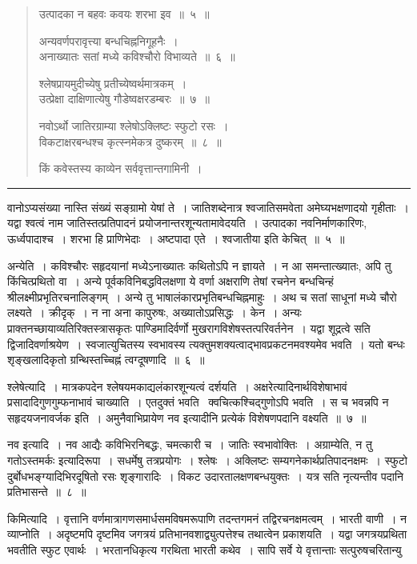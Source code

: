 \documentclass[11pt, openany]{book}
\begin{document}
\newpage

\begin{quote}
{\ha उत्पादका न बहवः कवयः शरभा इव~॥~५~॥

अन्यवर्णपरावृत्त्या बन्धचिह्ननिगूहनैः~।\\
अनाख्यातः सतां मध्ये कविश्चौरो विभाव्यते~॥~६~॥

श्लेषप्रायमुदीच्येषु प्रतीच्येष्वर्थमात्रकम्~।\\
उत्प्रेक्षा दाक्षिणात्येषु गौडेष्वक्षरडम्बरः~॥~७~॥

नवोऽर्थो जातिरग्राम्या श्लेषोऽक्लिष्टः स्फुटो रसः~।\\
विकटाक्षरबन्धश्च कृत्स्नमेकत्र दुष्करम्~॥~८~॥

किं कवेस्तस्य काव्येन सर्ववृत्तान्तगामिनी~।}
\end{quote}

\hrule

\noindent
{\s वानोऽप्यसंख्या नास्ति संख्यं सङ्ग्रामो येषां ते~। जातिशब्देनात्र श्वजातिसमवेता अमेघ्यभक्षणादयो गृहीताः~। यद्वा श्वत्वं नाम जातिस्तत्प्रतिपादनं प्रयोजनान्तरशून्यतामावेदयति~। उत्पादका नवनिर्माणकारिणः, ऊर्ध्वपादाश्च~। शरभा हि प्राणिभेदाः~। अष्टपादा एते~। श्वजातीया इति केचित्~॥~५~॥

{\qtt अन्येति}~। कविश्चौरः सहृदयानां मध्येऽनाख्यातः कथितोऽपि न ज्ञायते~। न आ समन्तात्ख्यातः, अपि तु किंचित्प्रथितो वा~। अन्ये पूर्वकविनिबद्धविलक्षणा ये वर्णा अक्षराणि तेषां रचनेन बन्धचिन्हं श्रीलक्ष्मीप्रभृतिरचनालिङ्गम्~। अन्ये तु भाषालंकारप्रभृतिबन्धचिह्नमाहुः~। अथ च सतां साधूनां मध्ये चौरो लक्ष्यते~। क्रीदृक्~। न ना अना कापुरुषः, अख्यातोऽप्रसिद्धः~। केन~। अन्यः प्राक्तनच्छायाव्यतिरिक्तस्त्रासकृतः पाण्डिमादिर्वर्णो मुखरागविशेषस्तत्परिवर्तनेन~। यद्वा शूद्रत्वे सति द्विजादिवर्णाश्रयेण~। स्वजात्युचितस्य स्वभावस्य त्यक्तुमशक्यत्वाद्भावप्रकटनमवश्यमेव भवति~। यतो बन्धः शृङ्खलादिकृतो ग्रन्थिस्तच्चिह्नं त्वग्दूषणादि~॥~६~॥

{\qtt श्लेषेत्यादि}~। मात्रकपदेन श्लेषयमकाद्यलंकारशून्यत्वं दर्शयति~। अक्षरेत्यादिनार्थविशेषाभावं प्रसादादिगुणगुम्फनाभावं चाख्याति~। एतदुक्तं भवति \textendash\ क्वचित्कश्चिद्गुणोऽपि भवति~। स च भवन्नपि न सहृदयजनावर्जक इति~। अमुनैवाभिप्रायेण नव इत्यादीनि प्रत्येकं विशेषणपदानि वक्ष्यति~॥~७~॥

{\qtt नव इत्यादि}~। नव आद्यैः कविभिरनिबद्धः, चमत्कारी च~। जातिः स्वभावोक्तिः~। अग्राम्येति, न तु {\qt गतोऽस्तमर्कः} इत्यादिरूपा~। सधर्मेषु तत्रप्रयोगः~। श्लेषः~। अक्लिष्टः सम्यगनेकार्थप्रतिपादनक्षमः~। स्फुटो दुर्बोधभङ्ग्यादिभिरदूषितो रसः शृङ्गारादिः~। विकट उदारतालक्षणबन्धयुक्तः~। यत्र सति नृत्यन्तीव पदानि प्रतिभासन्ते~॥~८~॥

{\qtt किमित्यादि}~। वृत्तानि वर्णमात्रागणसमार्धसमविषमरूपाणि तदन्तगमनं तद्विरचनक्षमत्वम्~। भारती वाणी~। न व्याप्नोति~। अदृष्टमपि दृष्टमिव जगत्रयं प्रतिभानवशाद्व्युत्पत्तेश्च तथात्वेन प्रकाशयति~। यद्वा जगत्रयप्रथिता भवतीति स्फुट एवार्थः~। भरतानधिकृत्य गरथिता भारती कथेव~। सापि सर्वे ये वृत्तान्ताः सत्पुरुषचरितान्यु\textendash}
\end{document}
